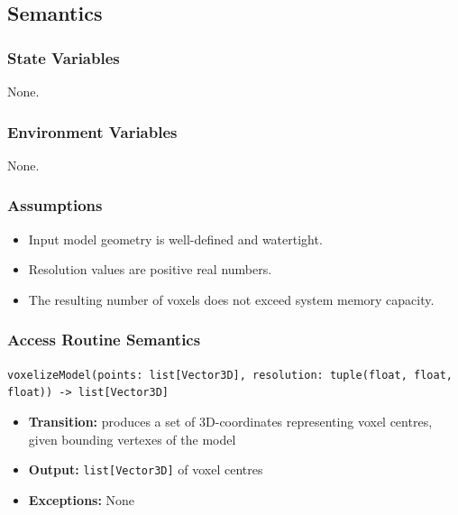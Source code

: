 \documentclass[12pt, titlepage]{article}
\begin{document}
\subsection{Semantics}

\subsubsection{State Variables}
None.

\subsubsection{Environment Variables}
None.

\subsubsection{Assumptions}
\begin{itemize}
  \item Input model geometry is well-defined and watertight.
  \item Resolution values are positive real numbers.
  \item The resulting number of voxels does not exceed system memory capacity.
\end{itemize}

\subsubsection{Access Routine Semantics}
\texttt{voxelizeModel(points: list[Vector3D], resolution: tuple(float, float, float)) -> list[Vector3D]}
\begin{itemize}
  \item \textbf{Transition:} produces a set of 3D-coordinates representing voxel centres, given bounding vertexes of the model
  \item \textbf{Output:} \texttt{list[Vector3D]} of voxel centres
  \item \textbf{Exceptions:} None
\end{itemize}
\end{document}
